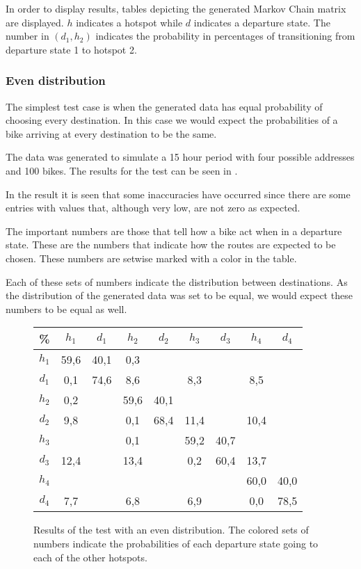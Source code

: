 In order to display results, tables depicting the generated Markov Chain matrix are displayed.
$h$ indicates a hotspot while $d$ indicates a departure state.
The number in $ (d_1,h_2) $ indicates the probability in percentages of transitioning from departure state 1 to hotspot 2. 

\subsubsection{Even distribution}
The simplest test case is when the generated data has equal probability of choosing every destination. 
In this case we would expect the probabilities of a bike arriving at every destination to be the same.

The data was generated to simulate a 15 hour period with four possible addresses and 100 bikes.
The results for the test can be seen in .

In the result it is seen that some inaccuracies have occurred since there are some entries with values that, although very low, are not zero as expected.

The important numbers are those that tell how a bike act when in a departure state.
These are the numbers that indicate how the routes are expected to be chosen.
These numbers are setwise marked with a color in the table.

Each of these sets of numbers indicate the distribution between destinations.
As the distribution of the generated data was set to be equal, we would expect these numbers to be equal as well.

\begin{figure}
	\centering
\begin{tabular}{|c | c c c c c c c c|}
\hline
\% &      $ h_1 $ & $ d_1 $ & $ h_2 $ & $ d_2 $ & $ h_3 $ & $ d_3 $ & $ h_4 $ & $ d_4 $\\
 \hline
$ h_1 $ & 59,6 &  40,1 & 0,3 &   &   &   &   &  \\
$ d_1 $ & 0,1 &  74,6 &  { \color{red} 8,6} &   &   {\color{red}8,3} &   &  {\color{red} 8,5} &  \\
$ h_2 $ & 0,2 &   &  59,6 &  40,1 &   &   &   &  \\
$ d_2 $ & {\color{blue}9,8} &   &   0,1 &  68,4 &  {\color{blue}11,4} &   &  {\color{blue}10,4} &  \\
$ h_3 $ & &   &   0,1 &   &  59,2 &  40,7 &   &  \\
$ d_3 $ & {\color{orange}12,4} &   &  {\color{orange}13,4} &   &   0,2 &  60,4 &  {\color{orange}13,7} &  \\
$ h_4 $ & &   &   &   &   &   &  60,0 &  40,0\\
$ d_4 $ & {\color{purple}7,7} &   &   {\color{purple}6,8} &   &   {\color{purple}6,9} &   &   0,0 &  78,5\\
\hline
\end{tabular}
\caption{Results of the test with an even distribution. The colored sets of numbers indicate the probabilities of each departure state going to each of the other hotspots.}\label{test_even}
\end{figure}

